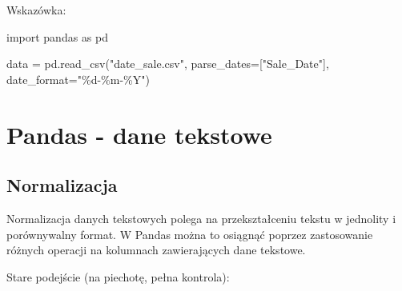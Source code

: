 \documentclass[
  polish,
  letterpaper,
  DIV=11,
  numbers=noendperiod]{scrreprt}
\newenvironment{Shaded}{\begin{snugshade}}{\end{snugshade}}
\newcommand{\ImportTok}[1]{\textcolor[rgb]{0.00,0.46,0.62}{#1}}
\newcommand{\NormalTok}[1]{\textcolor[rgb]{0.00,0.23,0.31}{#1}}
\newcommand{\OperatorTok}[1]{\textcolor[rgb]{0.37,0.37,0.37}{#1}}
\newcommand{\SpecialCharTok}[1]{\textcolor[rgb]{0.37,0.37,0.37}{#1}}
\newcommand{\StringTok}[1]{\textcolor[rgb]{0.13,0.47,0.30}{#1}}
\begin{document}
Wskazówka:

\begin{Shaded}
\begin{Highlighting}[]
\ImportTok{import}\NormalTok{ pandas }\ImportTok{as}\NormalTok{ pd}

\NormalTok{data }\OperatorTok{=}\NormalTok{ pd.read\_csv(}\StringTok{"date\_sale.csv"}\NormalTok{, parse\_dates}\OperatorTok{=}\NormalTok{[}\StringTok{"Sale\_Date"}\NormalTok{], date\_format}\OperatorTok{=}\StringTok{"}\SpecialCharTok{\%d}\StringTok{{-}\%m{-}\%Y"}\NormalTok{)}
\end{Highlighting}
\end{Shaded}

\chapter{Pandas - dane tekstowe}\label{pandas---dane-tekstowe}

\section{Normalizacja}\label{normalizacja}

Normalizacja danych tekstowych polega na przekształceniu tekstu w
jednolity i porównywalny format. W Pandas można to osiągnąć poprzez
zastosowanie różnych operacji na kolumnach zawierających dane tekstowe.

Stare podejście (na piechotę, pełna kontrola):
\end{document}
